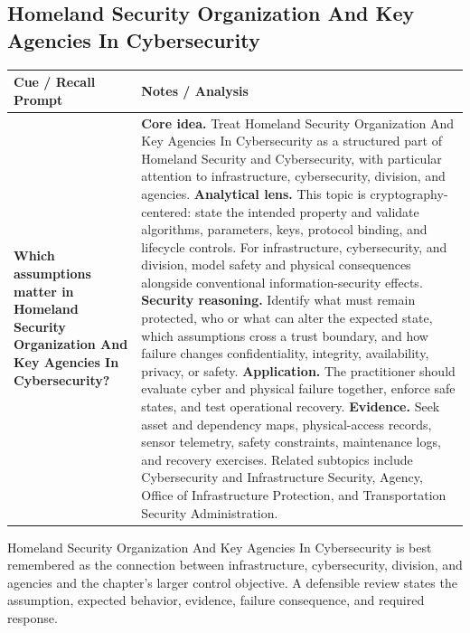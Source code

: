 \documentclass[11pt]{article}
\newcommand{\CornellHeader}{%
\rowcolor{Navy}\color{white}\bfseries Cue / Recall Prompt & \color{white}\bfseries Notes / Analysis\\\hline}
\newcommand{\CornellRow}[2]{%
\cellcolor{CueGray}\RaggedRight\textbf{#1} & \RaggedRight #2\\\hline}
\begin{document}
\subsection*{Homeland Security Organization And Key Agencies In Cybersecurity}
\begin{longtable}{>{\RaggedRight\arraybackslash}p{}|>{\RaggedRight\arraybackslash}p{}}
\CornellHeader
\CornellRow{Which assumptions matter in Homeland Security Organization And Key Agencies In Cybersecurity?}{\textbf{Core idea.} Treat Homeland Security Organization And Key Agencies In Cybersecurity as a structured part of Homeland Security and Cybersecurity, with particular attention to infrastructure, cybersecurity, division, and agencies. \textbf{Analytical lens.} This topic is cryptography-centered: state the intended property and validate algorithms, parameters, keys, protocol binding, and lifecycle controls. For infrastructure, cybersecurity, and division, model safety and physical consequences alongside conventional information-security effects. \textbf{Security reasoning.} Identify what must remain protected, who or what can alter the expected state, which assumptions cross a trust boundary, and how failure changes confidentiality, integrity, availability, privacy, or safety. \textbf{Application.} The practitioner should evaluate cyber and physical failure together, enforce safe states, and test operational recovery. \textbf{Evidence.} Seek asset and dependency maps, physical-access records, sensor telemetry, safety constraints, maintenance logs, and recovery exercises. Related subtopics include Cybersecurity and Infrastructure Security, Agency, Office of Infrastructure Protection, and Transportation Security Administration.}
\end{longtable}
\begin{topicsummary}
Homeland Security Organization And Key Agencies In Cybersecurity is best remembered as the connection between infrastructure, cybersecurity, division, and agencies and the chapter's larger control objective. A defensible review states the assumption, expected behavior, evidence, failure consequence, and required response.
\end{topicsummary}
\end{document}
